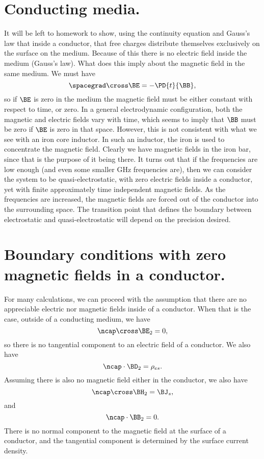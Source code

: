 \section{Conducting media.}
%
It will be left to homework to show, using the continuity equation and Gauss's law that
inside a conductor, that free charges distribute themselves exclusively on the surface on the medium.  Because of this there is no electric field inside the medium (Gauss's law).  What does this imply about the magnetic field in the same medium.  We must have
%
\begin{dmath}\label{eqn:emtLecture5:20}
\spacegrad \cross \BE = - \PD{t}{\BB},
\end{dmath}
%
so if \( \BE \) is zero in the medium the magnetic field must be either constant with respect to time, or zero.  In a general electrodynamic configuration, both the magnetic and electric fields vary with time, which seems to imply that \( \BB \) must be zero if \( \BE \) is zero in that space.
%
However, this is not consistent with what we see with an iron core inductor.  In such an inductor, the iron is used to
concentrate the magnetic field.  Clearly we have magnetic fields in the iron bar, since that is the purpose of it being there.  It turns out that if the frequencies are low enough (and even some smaller GHz frequencies are), then we can consider the system to be quasi-electrostatic, with zero electric fields inside a conductor, yet with finite approximately time independent magnetic fields.  As the frequencies are increased, the magnetic fields are forced out of the conductor into the surrounding space.
%
The transition point that defines the boundary between electrostatic and quasi-electrostatic will depend on the precision desired.
%
\section{Boundary conditions with zero magnetic fields in a conductor.}
%
For many calculations, we can proceed with the assumption that there are no appreciable electric nor magnetic fields inside of a conductor.  When that is the case, outside of a conducting medium, we have
%
\begin{dmath}\label{eqn:emtLecture5:40}
\ncap \cross \BE_2 = 0,
\end{dmath}
%
so there is no tangential component to an electric field of a conductor.  We also have
%
\begin{dmath}\label{eqn:emtLecture5:60}
\ncap \cdot \BD_2 = \rho_{es}.
\end{dmath}
%
Assuming there is also no magnetic field either in the conductor, we also have
%
\begin{dmath}\label{eqn:emtLecture5:80}
\ncap \cross \BH_2 = \BJ_s,
\end{dmath}
%
and
\begin{dmath}\label{eqn:emtLecture5:100}
\ncap \cdot \BB_2 = 0.
\end{dmath}
%
There is no normal component to the magnetic field at the surface of a conductor, and the tangential component is determined by the surface current density.
%
